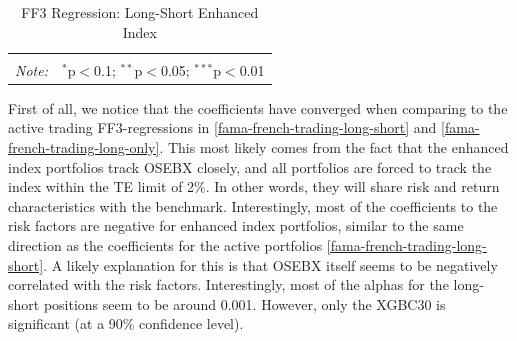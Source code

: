 \begin{table}[H]
\begin{tabularx}{\textwidth}{XXXX|XXX|XXX|l}
\hline 
\hline \\[-2ex] 
\textit{Note:}  & \multicolumn{10}{r}{$^{*}$p$<$0.1; $^{**}$p$<$0.05; $^{***}$p$<$0.01} \\ 
\end{tabularx} 
\vspace{1em}
\caption{{FF3 Regression: Long-Short Enhanced Index}} 
\label{fama-french-enhanced-long-short} 
\end{table}

First of all, we notice that the coefficients have converged when comparing to the active trading FF3-regressions in \autoref{fama-french-trading-long-short} and \autoref{fama-french-trading-long-only}. This most likely comes from the fact that the enhanced index portfolios track OSEBX closely, and all portfolios are forced to track the index within the TE limit of 2\%. In other words, they will share risk and return characteristics with the benchmark. Interestingly, most of the coefficients to the risk factors are negative for enhanced index portfolios, similar to the same direction as the coefficients for the active portfolios \autoref{fama-french-trading-long-short}. A likely explanation for this is that OSEBX itself seems to be negatively correlated with the risk factors. Interestingly, most of the alphas for the long-short positions seem to be around 0.001. However, only the XGBC30 is significant (at a 90\% confidence level).

